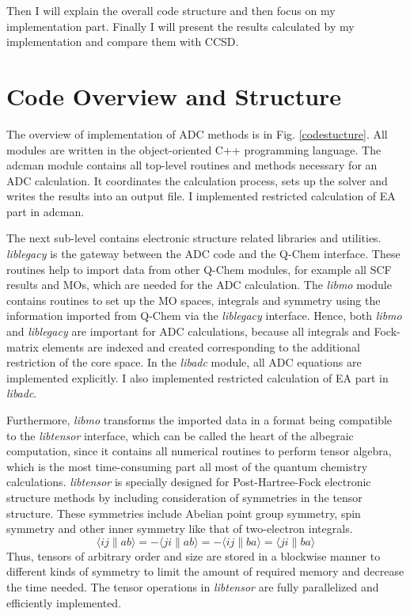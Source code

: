 Then I will explain the overall code structure and then focus on my implementation part.
Finally I will present the results calculated by my implementation and compare them with CCSD.

\section{Code Overview and Structure}
The overview of implementation of ADC methods is in Fig. \ref{codestucture}.
All modules are written in the object-oriented C++ programming language. 
The adcman module contains all top-level routines and methods necessary for an ADC calculation. 
It coordinates the calculation process, sets up the solver and writes the results into an output file.
I implemented restricted calculation of EA part in adcman.

The next sub-level contains electronic structure related libraries and utilities.
\emph{liblegacy} is the gateway between the ADC code and the Q-Chem interface.
These routines help to import data from other Q-Chem modules, for example all SCF results and MOs, which are needed for the ADC calculation.
The \emph{libmo} module contains routines to set up the MO spaces, integrals and symmetry using the information imported from Q-Chem via the \emph{liblegacy} interface.
Hence, both \emph{libmo} and \emph{liblegacy} are important for ADC calculations, because all integrals and Fock-matrix elements are indexed and created corresponding to the additional restriction of the core space.
In the \emph{libadc} module, all ADC equations are implemented explicitly.
I also implemented restricted calculation of EA part in \emph{libadc}.

Furthermore, \emph{libmo} transforms the imported data in a format being compatible to the \emph{libtensor} \cite{libtensor} interface, which can be called the heart of the albegraic computation, since it contains all numerical routines to perform tensor algebra, which is the most time-consuming part all most of the quantum chemistry calculations.
\emph{libtensor} is specially designed for Post-Hartree-Fock electronic structure methods by including consideration of symmetries in the tensor structure.
These symmetries include Abelian point group symmetry, spin symmetry and other inner symmetry like that of two-electron integrals.
\begin{equation}
	\langle i j\| a b\rangle=-\langle j i\| a b\rangle=-\langle i j \| b a\rangle=\langle j i\| b a\rangle
\end{equation}
Thus, tensors of arbitrary order and size are stored in a blockwise manner to different kinds of symmetry to limit the amount of required memory and decrease the time needed.
The tensor operations in \emph{libtensor} are fully parallelized and efficiently implemented.


